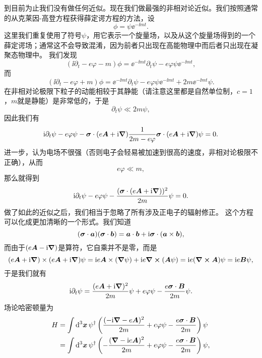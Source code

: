 到目前为止我们没有做任何近似。现在我们做最强的非相对论近似。我们按照通常的从克莱因-高登方程获得薛定谔方程的方法，设
\[
    \phi = \psi \ee^{-\ii m t}.
\]
这里我们重复使用了符号$\psi$，用它表示一个旋量场，以及从这个旋量场得到的一个薛定谔场；通常这不会导致混淆，因为前者只出现在高能物理中而后者只出现在凝聚态物理中。
我们发现
\[
    (\ii \partial_t - e \varphi - m) \phi = \ee^{-\ii m t} \partial_t \psi - e \varphi \psi \ee^{-\ii m t},
\]
而
\[
    (\ii \partial_t - e \varphi + m) \phi = \ee^{-\ii m t} \partial_t \psi - e \varphi \psi \ee^{-\ii m t} + 2 m \ee^{-\ii m t} \psi.
\]
在非相对论极限下粒子的动能相较于其静能（请注意这里都是自然单位制，$c=1$，$m$就是静能）是非常低的，于是
\[
    \partial_t \psi \ll 2m \psi,
\]
因此我们有
\[
    \mathrm{i} \partial_t \psi - e \varphi \psi - \vb*{\sigma} \cdot (e\vb*{A} + \mathrm{i} \grad) \frac{1}{2m - e\varphi} \vb*{\sigma} \cdot (e\vb*{A} + \mathrm{i} \grad) \psi = 0.
\]
进一步，认为电场不很强（否则电子会轻易被加速到很高的速度，非相对论极限不正确），从而
\[
    e \varphi \ll m,
\]
那么就得到
\begin{equation}
    \mathrm{i} \partial_t \psi - e \varphi \psi - \frac{(\vb*{\sigma} \cdot (e\vb*{A} + \mathrm{i} \grad))^2}{2m} \psi = 0.
\end{equation}
做了如此的近似之后，我们相当于忽略了所有涉及正电子的辐射修正。
这个方程可以化成更加清晰的一个形式。我们知道
\[
    (\vb*{\sigma} \cdot \vb*{a}) (\vb*{\sigma} \cdot \vb*{b}) = \vb*{a} \cdot \vb*{b} + \mathrm{i} \vb*{\sigma} \cdot (\vb*{a} \times \vb*{b}),
\]
而由于$(e\vb*{A} - \mathrm{i} \grad)$是算符，它自乘并不是零，而是
\[
    (e\vb*{A} + \mathrm{i} \grad) \times (e\vb*{A} + \mathrm{i} \grad) \psi = \mathrm{i} e \vb*{A} \times (\grad{\psi}) + \mathrm{i} e \curl{(\vb*{A} \psi)} = \mathrm{i} e  (\curl{\vb*{A}}) \psi = \mathrm{i} e \vb*{B} \psi,
\]
于是我们就有
\begin{equation}
    \mathrm{i} \partial_t \psi = \frac{(e \vb*{A} + \mathrm{i} \grad)^2}{2m} \psi + e \varphi \psi - \frac{e \vb*{\sigma} \cdot \vb*{B}}{2m} \psi.
\end{equation}
场论哈密顿量为
\begin{equation}
    \begin{aligned}
        H &= \int \dd[3]{\vb*{x}} \psi^\dagger \left( \frac{(- \mathrm{i} \grad - e \vb*{A})^2}{2m} + e \varphi \psi - \frac{e \vb*{\sigma} \cdot \vb*{B}}{2m} \right) \psi \\
        &= \int \dd[3]{\vb*{x}} \psi^\dagger \left( - \frac{(\grad - \mathrm{i} e \vb*{A})^2}{2m} + e \varphi \psi - \frac{e \vb*{\sigma} \cdot \vb*{B}}{2m} \right) \psi ,
    \end{aligned}
    \label{eq:minimal-coupling}
\end{equation}
